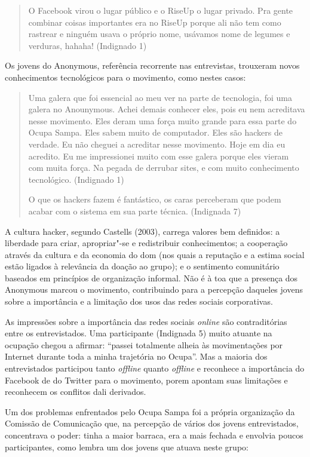 \begin{quote}
O Facebook virou o lugar público e o RiseUp o lugar privado. Pra gente
combinar coisas importantes era no RiseUp porque ali não tem como
rastrear e ninguém usava o próprio nome, usávamos nome de legumes e
verduras, hahaha! (Indignado 1)
\end{quote}

Os jovens do Anonymous, referência recorrente nas entrevistas, trouxeram
novos conhecimentos tecnológicos para o movimento, como nestes casos:

\begin{quote}
Uma galera que foi essencial ao meu ver na parte de tecnologia, foi uma
galera no Anounymous. Achei demais conhecer eles, pois eu nem acreditava
nesse movimento. Eles deram uma força muito grande para essa parte do
Ocupa Sampa. Eles sabem muito de computador. Eles são hackers de
verdade. Eu não cheguei a acreditar nesse movimento. Hoje em dia eu
acredito. Eu me impressionei muito com esse galera porque eles vieram
com muita força. Na pegada de derrubar sites, e com muito conhecimento
tecnológico. (Indignado 1)

O que os hackers fazem é fantástico, os caras perceberam que podem
acabar com o sistema em sua parte técnica. (Indignada 7)
\end{quote}

A cultura hacker, segundo Castells (2003), carrega valores bem
definidos: a liberdade para criar, apropriar"-se e redistribuir
conhecimentos; a cooperação através da cultura e da economia do dom (nos
quais a reputação e a estima social estão ligados à relevância da doação
ao grupo); e o sentimento comunitário baseados em princípios de
organização informal. Não é à toa que a presença dos Anonymous marcou o
movimento, contribuindo para a percepção daqueles jovens sobre a
importância e a limitação dos usos das redes sociais corporativas.

As impressões sobre a importância das redes sociais \emph{\emph{\emph{online}}} são
contraditórias entre os entrevistados. Uma participante (Indignada
5) muito atuante na ocupação chegou a afirmar: ``passei totalmente
alheia às movimentações por Internet durante toda a minha trajetória no
Ocupa''. Mas a maioria dos entrevistados participou tanto
\emph{\emph{offline}} quanto \emph{\emph{offline}} e reconhece a importância do
Facebook de do Twitter para o movimento, porem apontam suas limitações e
reconhecem os conflitos dali derivados.

Um dos problemas enfrentados pelo Ocupa Sampa foi a própria organização
da Comissão de Comunicação que, na percepção de vários dos jovens
entrevistados, concentrava o poder: tinha a maior barraca, era a mais
fechada e envolvia poucos participantes, como lembra um dos jovens
que atuava neste grupo:

